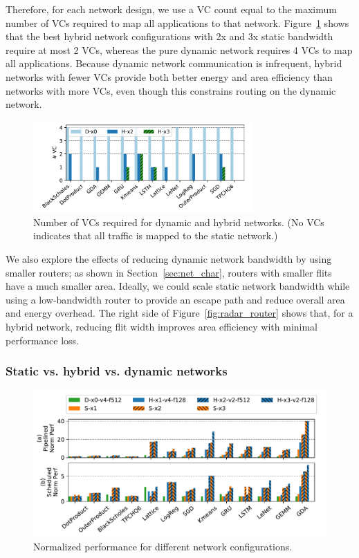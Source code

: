 Therefore, for each network design, we use a VC count equal to the maximum number of VCs required to map all applications to that network. 
Figure~\ref{fig:vc} shows that the best hybrid network configurations with 2x and 3x static bandwidth require at most 2 VCs, whereas the pure dynamic network requires 4 VCs to map all applications.
Because dynamic network communication is infrequent, hybrid networks with fewer VCs provide both better energy and area efficiency than networks with more VCs, even though this constrains routing on the dynamic network.

\begin{figure}
\centering
\includegraphics[width=0.75\textwidth]{network/figs/vc.pdf}
  \caption[Number of VCs required for dynamic and hybrid networks]{Number of VCs required for dynamic and hybrid networks. (No VCs indicates that all traffic is mapped to the static network.)}\label{fig:vc}
\end{figure}

We also explore the effects of reducing dynamic network bandwidth by using smaller routers;
as shown in Section~\ref{sec:net_char}, routers with smaller flits have a much smaller area.
Ideally, we could scale static network bandwidth while using a low-bandwidth router to provide an escape path and reduce overall area and energy overhead. 
The right side of Figure~\ref{fig:radar_router} shows that, for a hybrid network, reducing flit width improves area efficiency with minimal performance loss. 

\subsubsection{Static vs. hybrid vs. dynamic networks}

\begin{figure}
\centering
\includegraphics[width=1\linewidth]{network/figs/perf.pdf}
  \caption[Normalized performance for different network configurations]{Normalized performance for different network configurations.}\label{fig:perf}
\end{figure}

